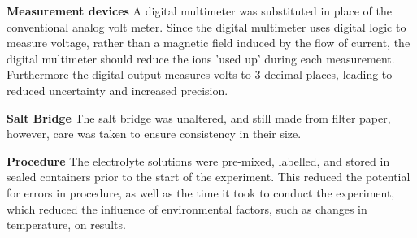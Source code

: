 \documentclass[11pt,a4paper]{article}
\begin{document}
\textbf{Measurement devices}\newline
A digital multimeter was substituted in place of the conventional analog volt meter. Since the digital multimeter uses digital logic to measure voltage, rather than a magnetic field induced by the flow of current, the digital multimeter should reduce the ions 'used up' during each measurement. Furthermore the digital output measures volts to 3 decimal places, leading to reduced uncertainty and increased precision. 

\textbf{Salt Bridge}\newline
The salt bridge was unaltered, and still made from filter paper, however, care was taken to ensure consistency in their size.

\textbf{Procedure}\newline
The electrolyte solutions were pre-mixed, labelled, and stored in sealed containers prior to the start of the experiment. This reduced the potential for errors in procedure, as well as the time it took to conduct the experiment, which reduced the influence of environmental factors, such as changes in temperature, on results.
\end{document}
